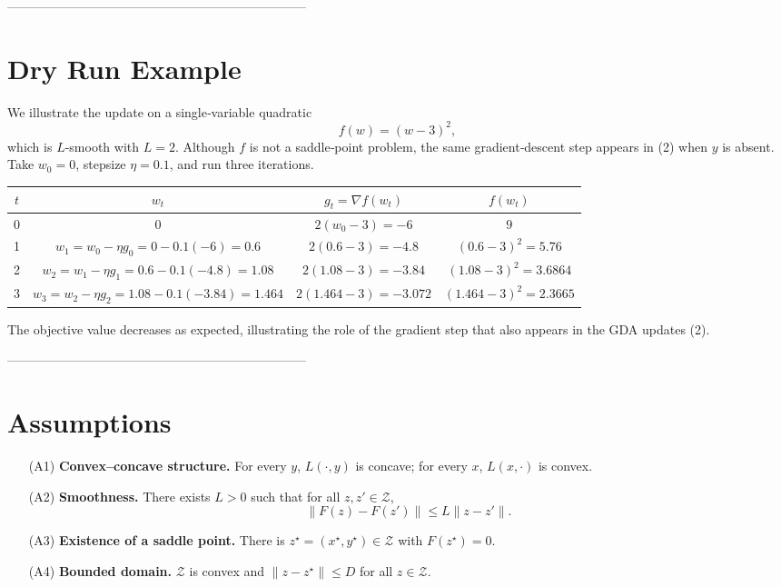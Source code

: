 \documentclass{article}
\begin{document}
-----------------------------------------------------------------------

\section*{Dry Run Example}
We illustrate the update on a single‑variable quadratic
\[
f(w)= (w-3)^2 ,
\]
which is $L$-smooth with $L=2$.
Although $f$ is not a saddle‑point problem, the same
gradient‑descent step appears in (2) when $y$ is absent.
Take $w_0=0$, stepsize $\eta=0.1$, and run three iterations.

\begin{center}
\begin{tabular}{c|c|c|c}
$t$ & $w_t$ & $g_t=\nabla f(w_t)$ & $f(w_t)$\\ \hline
0 & $0$ & $2(w_0-3)=-6$ & $9$\\
1 & $w_1=w_0-\eta g_0=0-0.1(-6)=0.6$ &
    $2(0.6-3)=-4.8$ & $(0.6-3)^2=5.76$\\
2 & $w_2=w_1-\eta g_1=0.6-0.1(-4.8)=1.08$ &
    $2(1.08-3)=-3.84$ & $(1.08-3)^2=3.6864$\\
3 & $w_3=w_2-\eta g_2=1.08-0.1(-3.84)=1.464$ &
    $2(1.464-3)=-3.072$ & $(1.464-3)^2=2.3665$\\
\end{tabular}
\end{center}
The objective value decreases as expected,
illustrating the role of the gradient step that also appears
in the GDA updates (2).

-----------------------------------------------------------------------

\section*{Assumptions}
\begin{enumerate}
\item[(A1)] \textbf{Convex–concave structure.}  
For every $y$, $L(\cdot ,y)$ is concave; for every $x$, $L(x,\cdot )$ is convex.

\item[(A2)] \textbf{Smoothness.}  
There exists $L>0$ such that for all $z,z'\in\mathcal Z$,
\[
\|F(z)-F(z')\|\le L\|z-z'\| .                                           \tag{4}
\]

\item[(A3)] \textbf{Existence of a saddle point.}  
There is $z^{\star}=(x^{\star},y^{\star})\in\mathcal Z$ with $F(z^{\star})=0$.

\item[(A4)] \textbf{Bounded domain.}  
$\mathcal Z$ is convex and $\|z-z^{\star}\|\le D$ for all $z\in\mathcal Z$.
\end{enumerate}
\end{document}
